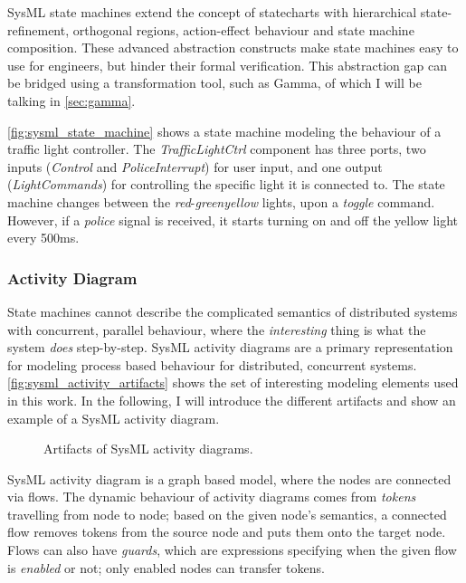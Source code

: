 SysML state machines extend the concept of statecharts with hierarchical state-refinement, orthogonal regions, action-effect behaviour and state machine composition. These advanced abstraction constructs make state machines easy to use for engineers, but hinder their formal verification. This abstraction gap can be bridged using a transformation tool, such as Gamma, of which I will be talking in \autoref{sec:gamma}.

\autoref{fig:sysml_state_machine} shows a state machine modeling the behaviour of a traffic light controller. The \emph{TrafficLightCtrl} component has three ports, two inputs (\emph{Control} and \emph{PoliceInterrupt}) for user input, and one output (\emph{LightCommands}) for controlling the specific light it is connected to. The state machine changes between the \emph{red}-\emph{green}\emph{yellow} lights, upon a \emph{toggle} command. However, if a \emph{police} signal is received, it starts turning on and off the yellow light every 500ms.

\subsubsection*{Activity Diagram}\label{ssec:sysml_activity}

State machines cannot describe the complicated semantics of distributed systems with concurrent, parallel behaviour, where the \emph{interesting} thing is what the system \emph{does} step-by-step. SysML activity diagrams are a primary representation for modeling process based behaviour \cite{omg_sysml} for distributed, concurrent systems. \autoref{fig:sysml_activity_artifacts} shows the set of interesting modeling elements used in this work. In the following, I will introduce the different artifacts and show an example of a SysML activity diagram.

\begin{figure}[!ht]
	\centering
	
	\caption{Artifacts of SysML activity diagrams.}
	\label{fig:sysml_activity_artifacts}
\end{figure}

SysML activity diagram is a graph based model, where the nodes are connected via flows. The dynamic behaviour of activity diagrams comes from \emph{tokens} travelling from node to node; based on the given node's semantics, a connected flow removes tokens from the source node and puts them onto the target node. Flows can also have \emph{guards}, which are expressions specifying when the given flow is \emph{enabled} or not; only enabled nodes can transfer tokens.

